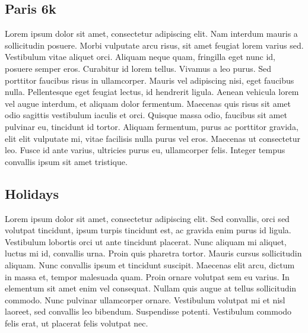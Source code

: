 \subsection{Paris 6k}
Lorem ipsum dolor sit amet, consectetur adipiscing elit. Nam interdum mauris a sollicitudin posuere. Morbi vulputate arcu risus, sit amet feugiat lorem varius sed. Vestibulum vitae aliquet orci. Aliquam neque quam, fringilla eget nunc id, posuere semper eros. Curabitur id lorem tellus. Vivamus a leo purus. Sed porttitor faucibus risus in ullamcorper. Mauris vel adipiscing nisi, eget faucibus nulla. Pellentesque eget feugiat lectus, id hendrerit ligula. Aenean vehicula lorem vel augue interdum, et aliquam dolor fermentum. Maecenas quis risus sit amet odio sagittis vestibulum iaculis et orci. Quisque massa odio, faucibus sit amet pulvinar eu, tincidunt id tortor. Aliquam fermentum, purus ac porttitor gravida, elit elit vulputate mi, vitae facilisis nulla purus vel eros. Maecenas ut consectetur leo. Fusce id ante varius, ultricies purus eu, ullamcorper felis. Integer tempus convallis ipsum sit amet tristique.

\subsection{Holidays}
Lorem ipsum dolor sit amet, consectetur adipiscing elit. Sed convallis, orci sed volutpat tincidunt, ipsum turpis tincidunt est, ac gravida enim purus id ligula. Vestibulum lobortis orci ut ante tincidunt placerat. Nunc aliquam mi aliquet, luctus mi id, convallis urna. Proin quis pharetra tortor. Mauris cursus sollicitudin aliquam. Nunc convallis ipsum et tincidunt suscipit. Maecenas elit arcu, dictum in massa et, tempor malesuada quam. Proin ornare volutpat sem eu varius. In elementum sit amet enim vel consequat. Nullam quis augue at tellus sollicitudin commodo. Nunc pulvinar ullamcorper ornare. Vestibulum volutpat mi et nisl laoreet, sed convallis leo bibendum. Suspendisse potenti. Vestibulum commodo felis erat, ut placerat felis volutpat nec.
  
  
 


